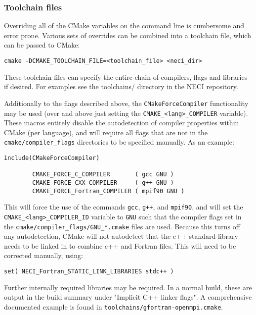 \documentclass[a4paper,notitlepage]{scrreprt}
\let\code\lstinline
\begin{document}
\subsubsection{Toolchain files}

    Overriding all of the CMake variables on the command line is cumbersome and error prone.
    Various sets of overrides can be combined into a toolchain file, which can be passed
    to CMake:
    \begin{lstlisting}[gobble=4]
        cmake -DCMAKE_TOOLCHAIN_FILE=<toolchain_file> <neci_dir>
    \end{lstlisting}
    These toolchain files can specify the entire chain of compilers, flags and libraries if
    desired. For examples see the toolchains/ directory in the NECI repository.

    Additionally to the flags described above, the \code{CMakeForceCompiler} functionality may
    be used (over and above just setting the \code{CMAKE_<lang>_COMPILER} variable).
    These macros entirely disable the autodetection of compiler properties within
    CMake (per language), and will require all flags that are not in the
    \code{cmake/compiler_flags} directories to be specified manually. As an example:
    \begin{lstlisting}[gobble=4]
        include(CMakeForceCompiler)

        CMAKE_FORCE_C_COMPILER       ( gcc GNU )
        CMAKE_FORCE_CXX_COMPILER     ( g++ GNU )
        CMAKE_FORCE_Fortran_COMPILER ( mpif90 GNU )
    \end{lstlisting}
    This will force the use of the commands \code{gcc}, \code{g++}, and \code{mpif90}, and will
    set the \code[breaklines=true]{CMAKE_<lang>_COMPILER_ID} variable to \code{GNU} such that
    the compiler flags set in the \code[breaklines=true]{cmake/compiler_flags/GNU_*.cmake}
    files are used. Because this turns off
    any autodetection, CMake will not autodetect that the c++ standard library needs to be
    linked in to combine c++ and Fortran files. This will need to be corrected manually, using:
    \begin{lstlisting}[gobble=4]
        set( NECI_Fortran_STATIC_LINK_LIBRARIES stdc++ )
    \end{lstlisting}
    Further internally required libraries may be required. In a normal build, these are
    output in the build summary under "Implicit C++ linker flags".
    A comprehensive documented example is found in \code{toolchains/gfortran-openmpi.cmake}.
\end{document}
